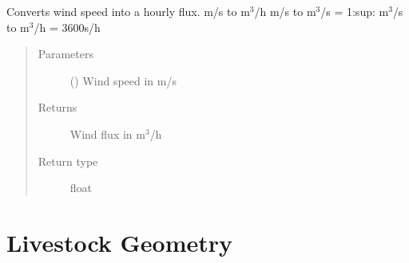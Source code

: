 \documentclass[letterpaper,10pt,english]{sphinxmanual}
\begin{document}
\begin{fulllineitems}
\label{\detokenize{air:livestock.air.wind_speed_to_hour_flux}}
Converts wind speed into a hourly flux.
m/s to m$^{\text{3}}$/h
m/s to m$^{\text{3}}$/s = 1:sup:
m$^{\text{3}}$/s to m$^{\text{3}}$/h = 3600s/h
\begin{quote}\begin{description}
\item[{Parameters}] \leavevmode
{} () \textendash{} Wind speed in m/s

\item[{Returns}] \leavevmode
Wind flux in m$^{\text{3}}$/h

\item[{Return type}] \leavevmode
float

\end{description}\end{quote}

\end{fulllineitems}







\section{Livestock Geometry}
\label{\detokenize{geometry:livestock-geometry}}\label{\detokenize{geometry::doc}}\label{\detokenize{geometry:id3}}\label{\detokenize{geometry:module-livestock.geometry}}
\end{document}
